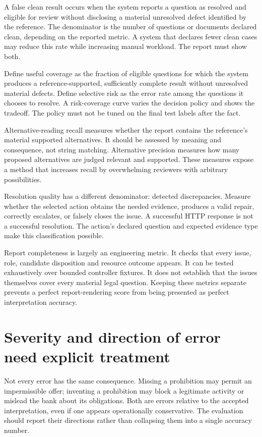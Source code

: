 A false clean result occurs when the system reports a question as resolved and
eligible for review without disclosing a material unresolved defect identified by
the reference. The denominator is the number of questions or documents declared
clean, depending on the reported metric. A system that declares fewer clean cases
may reduce this rate while increasing manual workload. The report must show both.

Define useful coverage as the fraction of eligible questions for which the system
produces a reference-supported, sufficiently complete result without unresolved
material defects. Define selective risk as the error rate among the questions it
chooses to resolve. A risk-coverage curve varies the decision policy and shows the
tradeoff. The policy must not be tuned on the final test labels after the fact.

Alternative-reading recall measures whether the report contains the reference's
material supported alternatives. It should be assessed by meaning and consequence,
not string matching. Alternative precision measures how many proposed alternatives
are judged relevant and supported. These measures expose a method that increases
recall by overwhelming reviewers with arbitrary possibilities.

Resolution quality has a different denominator: detected discrepancies. Measure
whether the selected action obtains the needed evidence, produces a valid repair,
correctly escalates, or falsely closes the issue. A successful HTTP response is
not a successful resolution. The action's declared question and expected evidence
type make this classification possible.

Report completeness is largely an engineering metric. It checks that every issue,
role, candidate disposition and resource outcome appears. It can be tested
exhaustively over bounded controller fixtures. It does not establish that the
issues themselves cover every material legal question. Keeping these metrics
separate prevents a perfect report-rendering score from being presented as
perfect interpretation accuracy.

\section{Severity and direction of error need explicit treatment}
\label{merge:M09:06}


Not every error has the same consequence. Missing a prohibition may permit an
impermissible offer; inventing a prohibition may block a legitimate activity or
mislead the bank about its obligations. Both are errors relative to the accepted
interpretation, even if one appears operationally conservative. The evaluation
should report their directions rather than collapsing them into a single accuracy
number.

